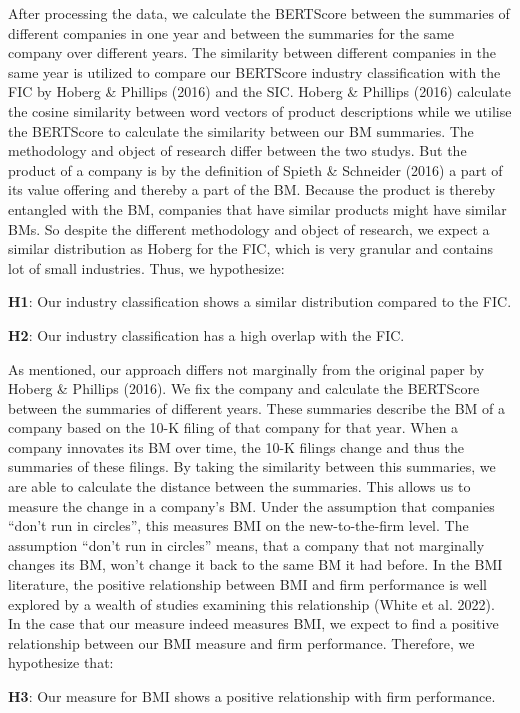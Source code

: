 \documentclass[
]{article}
\begin{document}
After processing the data, we calculate the BERTScore between the
summaries of different companies in one year and between the summaries
for the same company over different years. The similarity between
different companies in the same year is utilized to compare our
BERTScore industry classification with the FIC by Hoberg \& Phillips
(2016) and the SIC. Hoberg \& Phillips (2016) calculate the cosine
similarity between word vectors of product descriptions while we utilise
the BERTScore to calculate the similarity between our BM summaries. The
methodology and object of research differ between the two studys. But
the product of a company is by the definition of Spieth \& Schneider
(2016) a part of its value offering and thereby a part of the BM.
Because the product is thereby entangled with the BM, companies that
have similar products might have similar BMs. So despite the different
methodology and object of research, we expect a similar distribution as
Hoberg for the FIC, which is very granular and contains lot of small
industries. Thus, we hypothesize:

\textbf{H1}: Our industry classification shows a similar distribution
compared to the FIC.

\textbf{H2}: Our industry classification has a high overlap with the
FIC.

As mentioned, our approach differs not marginally from the original
paper by Hoberg \& Phillips (2016). We fix the company and calculate the
BERTScore between the summaries of different years. These summaries
describe the BM of a company based on the 10-K filing of that company
for that year. When a company innovates its BM over time, the 10-K
filings change and thus the summaries of these filings. By taking the
similarity between this summaries, we are able to calculate the distance
between the summaries. This allows us to measure the change in a
company's BM. Under the assumption that companies ``don't run in
circles'', this measures BMI on the new-to-the-firm level. The
assumption ``don't run in circles'' means, that a company that not
marginally changes its BM, won't change it back to the same BM it had
before. In the BMI literature, the positive relationship between BMI and
firm performance is well explored by a wealth of studies examining this
relationship (White et al. 2022). In the case that our measure indeed
measures BMI, we expect to find a positive relationship between our BMI
measure and firm performance. Therefore, we hypothesize that:

\textbf{H3}: Our measure for BMI shows a positive relationship with firm
performance.
\end{document}
